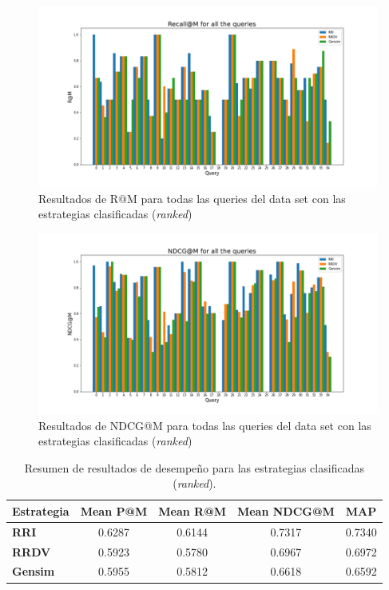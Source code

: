 \begin{figure}[H]
    \centering
    \includegraphics[width=\textwidth]{doc/images/R@M_Ranked.png}
    \caption{Resultados de R@M para todas las queries del data set con las estrategias clasificadas (\textit{ranked})}
    \label{fig:rankedR}
\end{figure}


\begin{figure}[H]
    \centering
    \includegraphics[width=\textwidth]{doc/images/NDCG@M_Ranked.png}
    \caption{Resultados de NDCG@M para todas las queries del data set con las estrategias clasificadas (\textit{ranked})}
    \label{fig:rankedNDCG}
\end{figure}


\begin{table}[H]
\centering
\begin{tabular}{|l|c|c|c|c|}
\hline
\textbf{Estrategia} & \multicolumn{1}{l|}{\textbf{Mean P@M}} & \multicolumn{1}{l|}{\textbf{Mean R@M}} & \multicolumn{1}{l|}{\textbf{Mean NDCG@M}} & \multicolumn{1}{l|}{\textbf{MAP}} \\ \hline
\textbf{RRI} & 0.6287 & 0.6144 & 0.7317 & 0.7340 \\ \hline
\textbf{RRDV} & 0.5923 & 0.5780 & 0.6967 & 0.6972 \\ \hline
\textbf{Gensim} & 0.5955 & 0.5812 & 0.6618 & 0.6592 \\ \hline
\end{tabular}
\caption{Resumen de resultados de desempeño para las estrategias clasificadas (\textit{ranked}).}
\label{tab:rankedResults}
\end{table}

